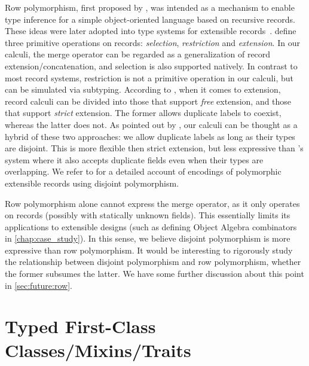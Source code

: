 Row polymorphism, first proposed by \citet{wand1987complete}, was intended as a
mechanism to enable type inference for a simple object-oriented language based
on recursive records. These ideas were later adopted into type systems for
extensible records~\citep{Harper:1991:RCB:99583.99603, leijen2005extensible,
  gaster1996polymorphic}. \citet{cardelli1989operations} define three primitive
operations on records: \textit{selection}, \textit{restriction} and
\textit{extension}. In our calculi, the merge operator can be regarded as a
generalization of record extension/concatenation, and selection is also
supported natively. In contrast to most record systems, restriction is not a
primitive operation in our calculi, but can be simulated via subtyping.
According to \citet{leijen2005extensible}, when it comes to extension, record
calculi can be divided into those that support \textit{free} extension, and
those that support \textit{strict} extension. The former allows duplicate labels
to coexist, whereas the latter does not. As pointed out by
\citet{alpuimdisjoint}, our calculi can be thought as a hybrid of these two
approaches: we allow duplicate labels as long as their types are disjoint. This
is more flexible then strict extension, but less expressive than
\citeauthor{leijen2005extensible}'s system where it also accepts duplicate
fields even when their types are overlapping. We refer to \citet{alpuimdisjoint}
for a detailed account of encodings of polymorphic extensible records using
disjoint polymorphism.


Row polymorphism alone cannot express the merge operator, as it only operates on
records (possibly with statically unknown fields). This essentially limits its
applications to extensible designs (such as defining Object Algebra combinators
in \cref{chap:case_study}). In this sense, we believe disjoint polymorphism is
more expressive than row polymorphism. It would be interesting to rigorously
study the relationship between disjoint polymorphism and row polymorphism,
whether the former subsumes the latter. We have some further discussion about
this point in \cref{sec:future:row}.



\section{Typed First-Class Classes/Mixins/Traits}

